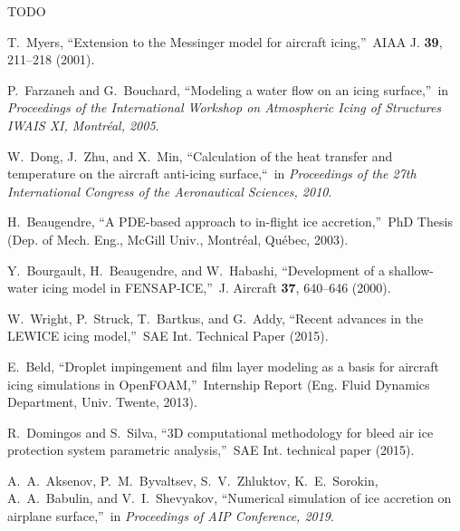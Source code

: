 \documentclass[
11pt,%
tightenlines,%
twoside,%
onecolumn,%
nofloats,%
nobibnotes,%
nofootinbib,%
superscriptaddress,%
noshowpacs,%
centertags]%
{revtex4}
\begin{document}
\begin{acknowledgments}
TODO
\end{acknowledgments}

\begin{thebibliography}{99}


T.~Myers, \textquotedblleft Extension to the Messinger model for aircraft icing,\textquotedblright \ AIAA J. \textbf{39}, 211--218 (2001).

P.~Farzaneh and G.~Bouchard, \textquotedblleft Modeling a water flow on an icing surface,\textquotedblright \ in \textit{Proceedings of the International Workshop on Atmospheric Icing of Structures IWAIS XI, Montr\'eal, 2005}.

W.~Dong, J.~Zhu, and X.~Min, \textquotedblleft Calculation of the heat transfer and temperature on the aircraft anti-icing surface,\textquotedblleft \ in \textit{Proceedings of the 27th International Congress of the Aeronautical Sciences, 2010}.

H.~Beaugendre, \textquotedblleft A PDE-based approach to in-flight ice accretion,\textquotedblright \ PhD Thesis (Dep. of Mech. Eng., McGill Univ., Montr\'eal, Qu\'ebec, 2003).


Y.~Bourgault, H.~Beaugendre, and W.~Habashi, \textquotedblleft Development of a shallow-water icing model in FENSAP-ICE,\textquotedblright \ J. Aircraft \textbf{37}, 640--646 (2000).

W.~Wright, P.~Struck, T.~Bartkus, and G.~Addy, \textquotedblleft Recent advances in the LEWICE icing model,\textquotedblright \ SAE Int. Technical Paper (2015).

E.~Beld, \textquotedblleft Droplet impingement and film layer modeling as a basis for aircraft icing simulations in OpenFOAM,\textquotedblright \ Internship Report (Eng. Fluid Dynamics Department, Univ. Twente, 2013).

R.~Domingos and S.~Silva, \textquotedblleft 3D computational methodology for bleed air ice protection system parametric analysis,\textquotedblright \ SAE Int. technical paper (2015).

A.~A.~Aksenov, P.~M.~Byvaltsev, S.~V.~Zhluktov, K.~E.~Sorokin, A.~A.~Babulin, and V.~I.~Shevyakov, \textquotedblleft Numerical simulation of ice accretion on airplane surface,\textquotedblright \ in \textit{Proceedings of AIP Conference, 2019}.


\end{thebibliography}
\end{document}
